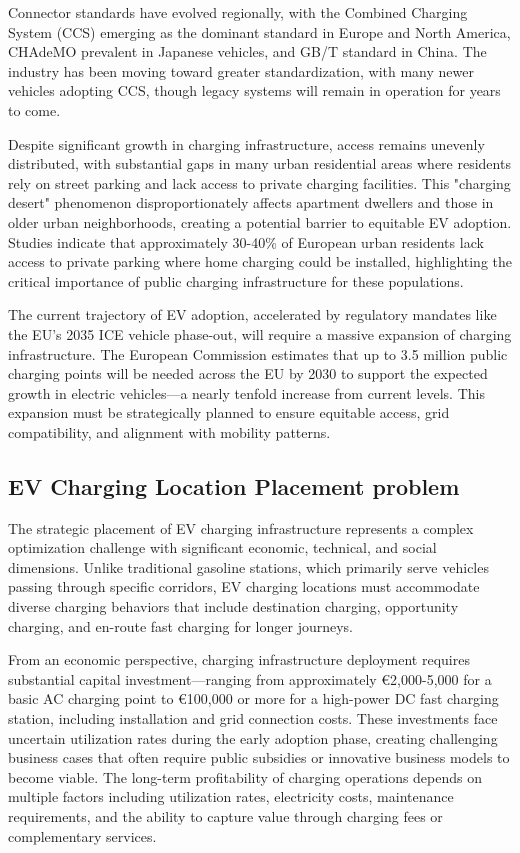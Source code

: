 Connector standards have evolved regionally, with the Combined Charging System (CCS) emerging as the dominant standard in Europe and North America, CHAdeMO prevalent in Japanese vehicles, and GB/T standard in China. The industry has been moving toward greater standardization, with many newer vehicles adopting CCS, though legacy systems will remain in operation for years to come.

Despite significant growth in charging infrastructure, access remains unevenly distributed, with substantial gaps in many urban residential areas where residents rely on street parking and lack access to private charging facilities. This "charging desert" phenomenon disproportionately affects apartment dwellers and those in older urban neighborhoods, creating a potential barrier to equitable EV adoption. Studies indicate that approximately 30-40\% of European urban residents lack access to private parking where home charging could be installed, highlighting the critical importance of public charging infrastructure for these populations.

The current trajectory of EV adoption, accelerated by regulatory mandates like the EU's 2035 ICE vehicle phase-out, will require a massive expansion of charging infrastructure. The European Commission estimates that up to 3.5 million public charging points will be needed across the EU by 2030 to support the expected growth in electric vehicles—a nearly tenfold increase from current levels. This expansion must be strategically planned to ensure equitable access, grid compatibility, and alignment with mobility patterns.

\subsection{EV Charging Location Placement problem}

The strategic placement of EV charging infrastructure represents a complex optimization challenge with significant economic, technical, and social dimensions. Unlike traditional gasoline stations, which primarily serve vehicles passing through specific corridors, EV charging locations must accommodate diverse charging behaviors that include destination charging, opportunity charging, and en-route fast charging for longer journeys.

From an economic perspective, charging infrastructure deployment requires substantial capital investment—ranging from approximately €2,000-5,000 for a basic AC charging point to €100,000 or more for a high-power DC fast charging station, including installation and grid connection costs. These investments face uncertain utilization rates during the early adoption phase, creating challenging business cases that often require public subsidies or innovative business models to become viable. The long-term profitability of charging operations depends on multiple factors including utilization rates, electricity costs, maintenance requirements, and the ability to capture value through charging fees or complementary services.

